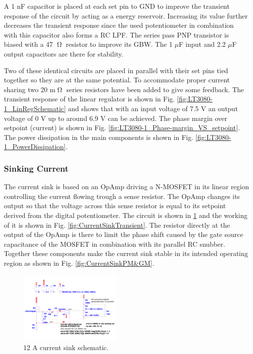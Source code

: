 A 1 nF capacitor is placed at each set pin to GND to improve the transient response of the circuit by acting as a energy reservoir. Increasing its value further decreases the transient response since the used potentiometer in combination with this capacitor also forms a RC LPF. The series pass PNP transistor is biased with a 47 $\tcohm$ resistor to improve its GBW. The 1 $\mu$F input and 2.2 $\mu$F output capacitors are there for stability.

Two of these identical circuits are placed in parallel with their set pins tied together so they are at the same potential. To accommodate proper current sharing two 20 m$\tcohm$ series resistors have been added to give some feedback.
The transient response of the linear regulator is shown in Fig. \ref{fig:LT3080-1_LinRegSchematic} and shows that with an input voltage of 7.5 V an output voltage of 0 V up to around 6.9 V can be achieved. The phase margin over setpoint (current) is shown in Fig. \ref{fig:LT3080-1_Phase-margin_VS_setpoint}. The power dissipation in the main components is shown in Fig. \ref{fig:LT3080-1_PowerDissipation}.

\subsubsection{Sinking Current}
The current sink is based on an OpAmp driving a N-MOSFET in its linear region controlling the current flowing trough a sense resistor. The OpAmp changes its output so that the voltage across this sense resistor is equal to its setpoint derived from the digital potentiometer. The circuit is shown in \ref{fig:CurrentSinkSchematic} and the working of it is shown in Fig. \ref{fig:CurrentSinkTransient}. The resistor directly at the output of the OpAmp is there to limit the phase shift caused by the gate source capacitance of the MOSFET in combination with its parallel RC snubber. Together these components make the current sink stable in its intended operating region as shown in Fig. \ref{fig:CurrentSinkPM&GM}.

\begin{figure}[h!]
    \centering
    \includegraphics[width=0.45\textwidth]{CurrentSinkSchematic.pdf}
    \caption{12 A current sink schematic.}
    \label{fig:CurrentSinkSchematic}
\end{figure}


